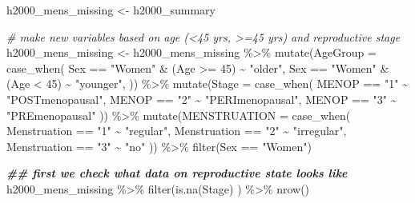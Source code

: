 \documentclass[
]{article}
\newenvironment{Shaded}{\begin{snugshade}}{\end{snugshade}}
\newcommand{\AttributeTok}[1]{\textcolor[rgb]{0.77,0.63,0.00}{#1}}
\newcommand{\CommentTok}[1]{\textcolor[rgb]{0.56,0.35,0.01}{\textit{#1}}}
\newcommand{\DecValTok}[1]{\textcolor[rgb]{0.00,0.00,0.81}{#1}}
\newcommand{\DocumentationTok}[1]{\textcolor[rgb]{0.56,0.35,0.01}{\textbf{\textit{#1}}}}
\newcommand{\FunctionTok}[1]{\textcolor[rgb]{0.00,0.00,0.00}{#1}}
\newcommand{\NormalTok}[1]{#1}
\newcommand{\OtherTok}[1]{\textcolor[rgb]{0.56,0.35,0.01}{#1}}
\newcommand{\SpecialCharTok}[1]{\textcolor[rgb]{0.00,0.00,0.00}{#1}}
\newcommand{\StringTok}[1]{\textcolor[rgb]{0.31,0.60,0.02}{#1}}
\begin{document}
\begin{Shaded}
\begin{Highlighting}[]
\NormalTok{h2000\_mens\_missing }\OtherTok{\textless{}{-}}\NormalTok{ h2000\_summary }

\CommentTok{\# make new variables based on age (\textless{}45 yrs, \textgreater{}=45 yrs) and reproductive stage}
\NormalTok{h2000\_mens\_missing }\OtherTok{\textless{}{-}}\NormalTok{ h2000\_mens\_missing }\SpecialCharTok{\%\textgreater{}\%} 
  \FunctionTok{mutate}\NormalTok{(}\AttributeTok{AgeGroup =} \FunctionTok{case\_when}\NormalTok{(}
\NormalTok{    Sex }\SpecialCharTok{==} \StringTok{"Women"} \SpecialCharTok{\&}\NormalTok{ (Age }\SpecialCharTok{\textgreater{}=} \DecValTok{45}\NormalTok{) }\SpecialCharTok{\textasciitilde{}} \StringTok{"older"}\NormalTok{,}
\NormalTok{    Sex }\SpecialCharTok{==} \StringTok{"Women"} \SpecialCharTok{\&}\NormalTok{ (Age }\SpecialCharTok{\textless{}} \DecValTok{45}\NormalTok{) }\SpecialCharTok{\textasciitilde{}} \StringTok{"younger"}\NormalTok{,}
\NormalTok{    )) }\SpecialCharTok{\%\textgreater{}\%} 
  \FunctionTok{mutate}\NormalTok{(}\AttributeTok{Stage =} \FunctionTok{case\_when}\NormalTok{(}
\NormalTok{    MENOP }\SpecialCharTok{==} \StringTok{"1"} \SpecialCharTok{\textasciitilde{}} \StringTok{"POSTmenopausal"}\NormalTok{,}
\NormalTok{    MENOP }\SpecialCharTok{==} \StringTok{"2"} \SpecialCharTok{\textasciitilde{}} \StringTok{"PERImenopausal"}\NormalTok{,}
\NormalTok{    MENOP }\SpecialCharTok{==} \StringTok{"3"} \SpecialCharTok{\textasciitilde{}} \StringTok{"PREmenopausal"}
\NormalTok{  )) }\SpecialCharTok{\%\textgreater{}\%} 
  \FunctionTok{mutate}\NormalTok{(}\AttributeTok{MENSTRUATION =} \FunctionTok{case\_when}\NormalTok{(}
\NormalTok{    Menstruation }\SpecialCharTok{==} \StringTok{"1"} \SpecialCharTok{\textasciitilde{}} \StringTok{"regular"}\NormalTok{,}
\NormalTok{    Menstruation }\SpecialCharTok{==} \StringTok{"2"} \SpecialCharTok{\textasciitilde{}} \StringTok{"irregular"}\NormalTok{,}
\NormalTok{    Menstruation }\SpecialCharTok{==} \StringTok{"3"} \SpecialCharTok{\textasciitilde{}} \StringTok{"no"}
\NormalTok{  )) }\SpecialCharTok{\%\textgreater{}\%} 
  \FunctionTok{filter}\NormalTok{(Sex }\SpecialCharTok{==} \StringTok{"Women"}\NormalTok{) }

\DocumentationTok{\#\# first we check  what data on reproductive state looks like }
\NormalTok{h2000\_mens\_missing }\SpecialCharTok{\%\textgreater{}\%} 
  \FunctionTok{filter}\NormalTok{(}\FunctionTok{is.na}\NormalTok{(Stage) ) }\SpecialCharTok{\%\textgreater{}\%} 
  \FunctionTok{nrow}\NormalTok{() }
\end{Highlighting}
\end{Shaded}
\end{document}
